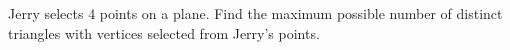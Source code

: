 Jerry selects $4$ points on a plane. Find the maximum possible number of distinct triangles with vertices selected from Jerry's points.
